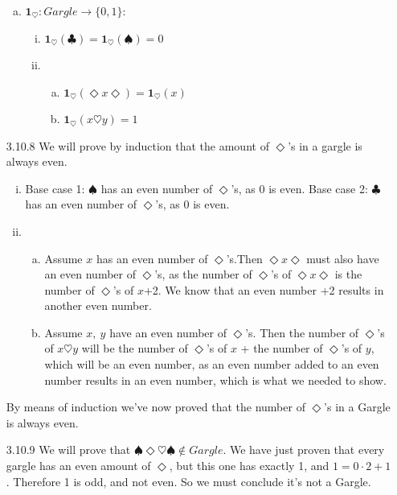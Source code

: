 \begin{itemize}
\begin{enumerate}[(a)]
    \item     $\textbf{1}_\heartsuit: Gargle \rightarrow \{0,1\}$:\begin{enumerate}[(i)]
        \item    $\textbf{1}_\heartsuit(\clubsuit) =\textbf{1}_\heartsuit(\spadesuit) = 0$
        \item \begin{enumerate}[(a)]
            \item $\textbf{1}_\heartsuit(\Diamond x\Diamond)= \textbf{1}_\heartsuit(x)$
            \item $\textbf{1}_\heartsuit (x\heartsuit y)= 1$
        \end{enumerate}
    \end{enumerate}
\end{enumerate}
\item[3.10.8] We will prove by induction that the amount of $\Diamond$'s in a gargle is always even.
\begin{enumerate}[(i)]
    \item Base case 1: $\spadesuit$ has an even number of $\Diamond$'s, as 0 is even.
Base case 2: $\clubsuit$ has an even number of $\Diamond$'s, as 0 is even.
\item \begin{enumerate}[(a)]
    \item Assume $x$ has an even number of $\Diamond$'s.Then $\Diamond x \Diamond$ must also have an even number of $\Diamond$'s, as the number of $\Diamond$'s of $\Diamond x \Diamond$ is the number of $\Diamond$'s of $x$+2. We know that an even number +2 results in another even number.
    \item Assume $x,\ y$ have an even number of $\Diamond$'s. Then the number of $\Diamond$'s of $x\heartsuit y$ will be the number of $\Diamond$'s of $x$ + the number of $\Diamond$'s of $y$, which will be an even number, as an even number added to an even number results in an even number, which is what we needed to show.\\
\end{enumerate}
\end{enumerate}
    By means of induction we've now proved that the number of $\Diamond$'s in a Gargle is always even. 
\item[3.10.9]
We will prove that $\spadesuit\Diamond\heartsuit\spadesuit \not \in Gargle$. We have just proven that every gargle has an even amount of $\Diamond$, but this one has exactly 1, and $1 = 0 \cdot 2 + 1$. Therefore 1 is odd, and not even. So we must conclude it's not a Gargle.
\end{itemize}	
	
